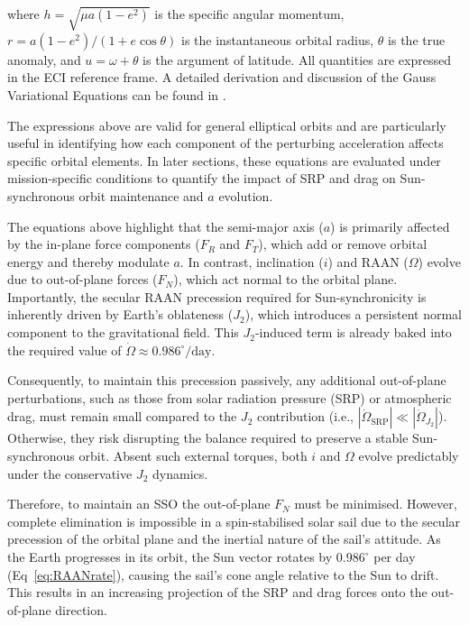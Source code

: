 \documentclass[final,3p,times,twocolumn]{elsarticle}
\begin{document}
\par\noindent where \( h = \sqrt{\mu a (1 - e^2)} \) is the specific angular momentum, \( r = a(1 - e^2)/(1 + e \cos{\theta}) \) is the instantaneous orbital radius, \( \theta \) is the true anomaly, and \( u = \omega + \theta \) is the argument of latitude. All quantities are expressed in the ECI reference frame. A detailed derivation and discussion of the Gauss Variational Equations can be found in \cite{vallado2007}.

\vspace{5pt}
\noindent The expressions above are valid for general elliptical orbits and are particularly useful in identifying how each component of the perturbing acceleration affects specific orbital elements. In later sections, these equations are evaluated under mission-specific conditions to quantify the impact of SRP and drag on Sun-synchronous orbit maintenance and \( a \) evolution.

\vspace{5pt}
\par\noindent The equations above highlight that the semi-major axis (\( a \)) is primarily affected by the in-plane force components (\( F_R \) and \( F_T \)), which add or remove orbital energy and thereby modulate \( a \). In contrast, inclination (\( i \)) and RAAN (\( \Omega \)) evolve due to out-of-plane forces (\( F_N \)), which act normal to the orbital plane. Importantly, the secular RAAN precession required for Sun-synchronicity is inherently driven by Earth’s oblateness (\( J_2 \)), which introduces a persistent normal component to the gravitational field. This \( J_2 \)-induced term is already baked into the required value of \( \dot{\Omega} \approx 0.986^\circ/\text{day} \).

\vspace{5pt}
\par\noindent Consequently, to maintain this precession passively, any additional out-of-plane perturbations, such as those from solar radiation pressure (SRP) or atmospheric drag, must remain small compared to the \( J_2 \) contribution (i.e., \(|\dot{\Omega}_{\text{SRP}}| \ll |\dot{\Omega}_{J_2}|\)). Otherwise, they risk disrupting the balance required to preserve a stable Sun-synchronous orbit. Absent such external torques, both \( i \) and \( \Omega \) evolve predictably under the conservative \( J_2 \) dynamics.

\vspace{5pt}
\par\noindent Therefore, to maintain an SSO the out-of-plane \( F_N \) must be minimised. However, complete elimination is impossible in a spin-stabilised solar sail due to the secular precession of the orbital plane and the inertial nature of the sail's attitude. As the Earth progresses in its orbit, the Sun vector rotates by \(0.986^\circ\) per day (Eq~\eqref{eq:RAANrate}), causing the sail’s cone angle relative to the Sun to drift. This results in an increasing projection of the SRP and drag forces onto the out-of-plane direction.
\end{document}
